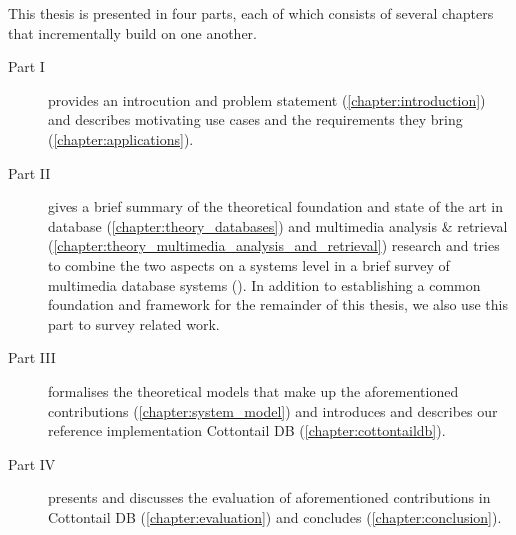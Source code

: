 This thesis is presented in four parts, each of which consists of several chapters that incrementally build on one another.

\begin{description}
    \item[Part I] provides an introcution and problem statement (\cref{chapter:introduction}) and describes motivating use cases and the requirements they bring (\cref{chapter:applications}).
    \item[Part II] gives a brief summary of the theoretical foundation and state of the art in database (\cref{chapter:theory_databases}) and multimedia analysis \& retrieval (\cref{chapter:theory_multimedia_analysis_and_retrieval}) research and tries to combine the two aspects on a systems level in a brief survey of multimedia database systems (). In addition to establishing a common foundation and framework for the remainder of this thesis, we also use this part to survey related work.
    \item[Part III] formalises the theoretical models that make up the aforementioned contributions (\cref{chapter:system_model}) and introduces and describes our reference implementation Cottontail DB (\cref{chapter:cottontaildb}).
    \item[Part IV] presents and discusses the evaluation of aforementioned contributions in Cottontail DB (\cref{chapter:evaluation}) and concludes (\cref{chapter:conclusion}).
\end{description}